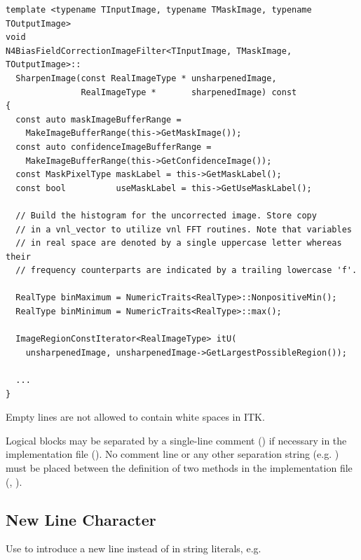 \small
\begin{verbatim}
template <typename TInputImage, typename TMaskImage, typename TOutputImage>
void
N4BiasFieldCorrectionImageFilter<TInputImage, TMaskImage, TOutputImage>::
  SharpenImage(const RealImageType * unsharpenedImage,
               RealImageType *       sharpenedImage) const
{
  const auto maskImageBufferRange =
    MakeImageBufferRange(this->GetMaskImage());
  const auto confidenceImageBufferRange =
    MakeImageBufferRange(this->GetConfidenceImage());
  const MaskPixelType maskLabel = this->GetMaskLabel();
  const bool          useMaskLabel = this->GetUseMaskLabel();

  // Build the histogram for the uncorrected image. Store copy
  // in a vnl_vector to utilize vnl FFT routines. Note that variables
  // in real space are denoted by a single uppercase letter whereas their
  // frequency counterparts are indicated by a trailing lowercase 'f'.

  RealType binMaximum = NumericTraits<RealType>::NonpositiveMin();
  RealType binMinimum = NumericTraits<RealType>::max();

  ImageRegionConstIterator<RealImageType> itU(
    unsharpenedImage, unsharpenedImage->GetLargestPossibleRegion());

  ...
}
\end{verbatim}
\normalsize

Empty lines are not allowed to contain white spaces in ITK.

Logical blocks may be separated by a single-line comment () if
necessary in the implementation file (). No comment line or any other
separation string (e.g. \code{/***********************/}) must be placed between
the definition of two methods in the implementation file (,
).


\subsection{New Line Character}%
\label{subsec:NewLineCharacter}

Use  to introduce a new line instead of  in string
literals, e.g.

